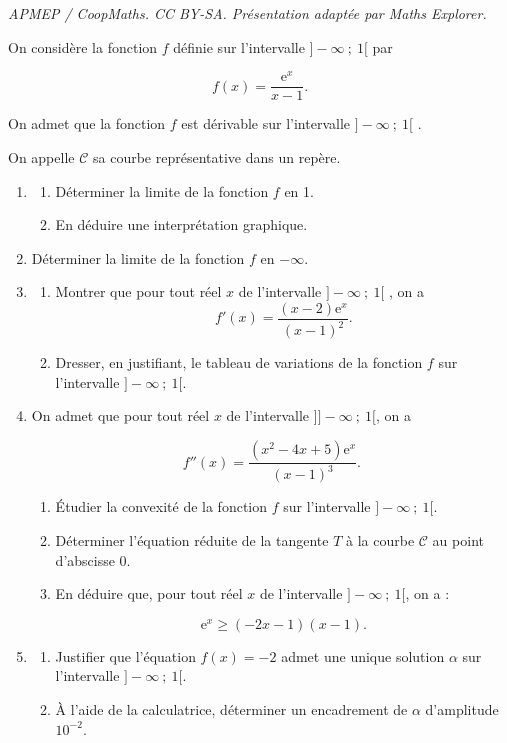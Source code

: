 \documentclass[10pt]{article}
\providecommand{\e}{{\mathrm{e}}}
\begin{document}
\noindent\textit{APMEP / CoopMaths. CC BY-SA. Présentation adaptée par Maths Explorer.}\par\medskip
\medskip

On considère la fonction $f$ définie sur l'intervalle $]-\infty~;~1[$ par 

\[f(x) = \dfrac{\e^x}{x - 1}.\]

On admet que la fonction $f$ est dérivable sur l'intervalle $]-\infty~;~1[$ .

On appelle $\mathcal{C}$ sa courbe représentative dans un repère.

\medskip

\begin{enumerate}
\item 
	\begin{enumerate}
		\item Déterminer la limite de la fonction $f$ en 1.
		\item En déduire une interprétation graphique.
	\end{enumerate}
\item Déterminer la limite de la fonction $f$ en $-\infty$.
\item 
	\begin{enumerate}
		\item Montrer que pour tout réel $x$ de l'intervalle $]-\infty~;~1[$ , on a 
		\[f'(x) = \dfrac{(x - 2)\e^x}{(x - 1)^2}.\]
		
		\item Dresser, en justifiant, le tableau de variations de la fonction $f$ sur l'intervalle $]-\infty~;~1[$.

	\end{enumerate}
\item On admet que pour tout réel $x$ de l'intervalle ]$]-\infty~;~1[$, on a 

\[f''(x) = \dfrac{\left(x^2 -4x + 5\right)\e^x}{(x - 1)^3}.\]

	\begin{enumerate}
		\item Étudier la convexité de la fonction $f$ sur l'intervalle $]-\infty~;~1[$.
		\item Déterminer l'équation réduite de la tangente $T$ à la courbe $\mathcal{C}$ au point d'abscisse 0.
		\item En déduire que, pour tout réel $x$ de l'intervalle $]-\infty~;~1[$, on a :
		
\[\e^x \geqslant  (-2x - 1)(x-1).\]

	\end{enumerate}
\item 
	\begin{enumerate}
		\item Justifier que l'équation $f(x) = -2$ admet une unique solution $\alpha$ sur l'intervalle $]-\infty~;~1[$.
		\item À l'aide de la calculatrice, déterminer un encadrement de $\alpha$ d'amplitude $10^{-2}$.
	\end{enumerate}
\end{enumerate}

\medskip
\end{document}
